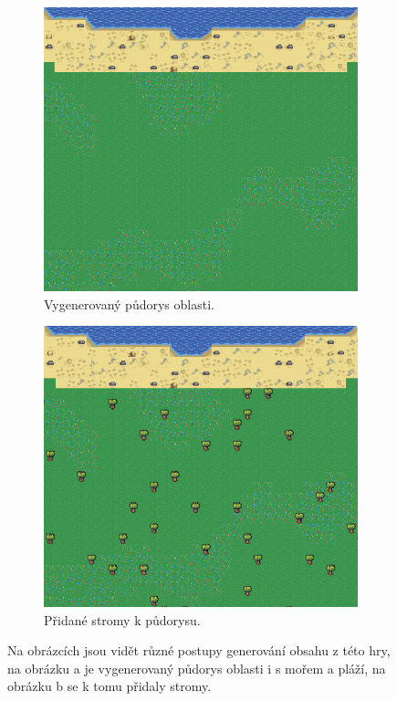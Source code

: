 \begin{figure}[h]
	\centering
	\begin{subfigure}{0.475\textwidth}
		\centering
		\includegraphics[scale=0.5]{obrazky-figures/layoutNoTrees.png}
		\caption{Vygenerovaný půdorys oblasti.}
	\end{subfigure}
	\begin{subfigure}{0.475\textwidth}
		\centering
		\includegraphics[scale=0.5]{obrazky-figures/treesAdded.png}
		\caption{Přidané stromy k půdorysu.}
	\end{subfigure}
	\caption{Na obrázcích jsou vidět různé postupy generování obsahu z této hry, na obrázku a je vygenerovaný půdorys oblasti i s mořem a pláží, na obrázku b se k tomu přidaly stromy.}
\end{figure}

